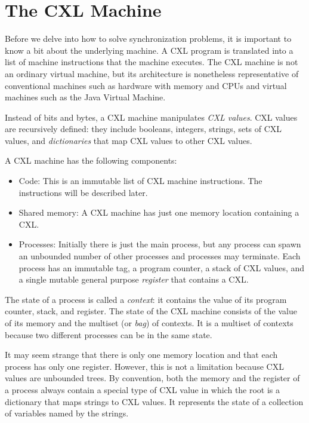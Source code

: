 \documentclass{book}
\begin{document}
\chapter{The CXL Machine}

Before we delve into how to solve synchronization problems, it is important
to know a bit about the underlying machine.  A CXL program is translated
into a list of machine instructions that the machine executes.
The CXL machine is not an ordinary virtual machine, but its architecture
is nonetheless representative of conventional machines such as hardware
with memory and CPUs and virtual machines such as the Java Virtual Machine.

Instead of bits and bytes, a CXL machine manipulates \emph{CXL values}.
CXL values are recursively defined: they include booleans, integers, strings,
sets of CXL values, and \emph{dictionaries} that map CXL values to other CXL
values.

A CXL machine has the following components:
\begin{itemize}
\item Code:  This is an immutable list of CXL machine instructions.  The
instructions will be described later.
\item Shared memory: A CXL machine has just one memory location containing
a CXL.
\item Processes:  Initially there is just the main process, but any process
can spawn an unbounded number of other processes and processes may terminate.
Each process has an immutable tag, a program counter, a stack of CXL values,
and a single mutable general purpose \emph{register} that contains a CXL.
\end{itemize}

The state of a process is called a \emph{context}: it contains the value of
its program counter, stack, and register.  The state of the CXL machine
consists of the value of its memory and the multiset (or \emph{bag}) of
contexts.  It is a multiset of contexts because two different processes can
be in the same state.

It may seem strange that there is only one memory location and that each
process has only one register.  However, this is not a limitation because
CXL values are unbounded trees.
By convention, both the memory and the register of a process always contain
a special type of CXL value in which the root is a dictionary
that maps strings to CXL values.  It represents the state of a collection of
variables named by the strings.
\end{document}
